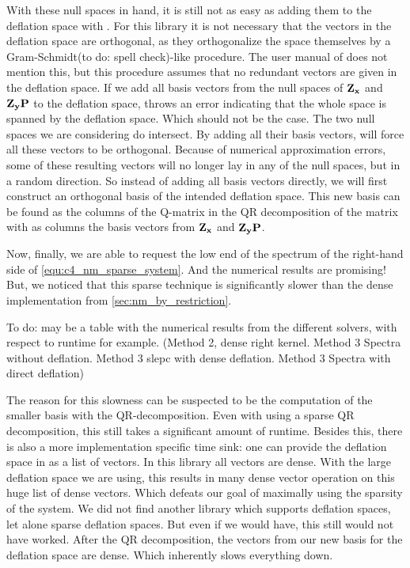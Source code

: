 With these null spaces in hand, it is still not as easy as adding them to the deflation space with \slepc. For this library it is not necessary that the vectors in the deflation space are orthogonal, as they orthogonalize the space themselves by a Gram-Schmidt({{\color{red}to do: spell check}})-like procedure. The user manual of \slepc does not mention this, but this procedure assumes that no redundant vectors are given in the deflation space. If we add all basis vectors from the null spaces of $\vb{Z_x}$ and $\vb{Z_y}\vb{P}$ to the deflation space, \slepc throws an error indicating that the whole space is spanned by the deflation space. Which should not be the case. The two null spaces we are considering do intersect. By adding all their basis vectors, \slepc will force all these vectors to be orthogonal. Because of numerical approximation errors, some of these resulting vectors will no longer lay in any of the null spaces, but in a random direction. So instead of adding all basis vectors directly, we will first construct an orthogonal basis of the intended deflation space. This new basis can be found as the columns of the Q-matrix in the QR decomposition of the matrix with as columns the basis vectors from $\vb{Z_x}$ and $\vb{Z_y} \vb{P}$.

Now, finally, we are able to request the low end of the spectrum of the right-hand side of \eqref{equ:c4_nm_sparse_system}. And the numerical results are promising! But, we noticed that this sparse technique is significantly slower than the dense implementation from \ref{sec:nm_by_restriction}.

{\color{red} To do: may be a table with the numerical results from the different solvers, with respect to runtime for example. (Method 2, dense right kernel. Method 3 Spectra without deflation. Method 3 slepc with dense deflation. Method 3 Spectra with direct deflation)}

The reason for this slowness can be suspected to be the computation of the smaller basis with the QR-decomposition. Even with using a sparse QR decomposition, this still takes a significant amount of runtime. Besides this, there is also a more implementation specific time sink: one can provide the deflation space in \slepc as a list of vectors. In this library all vectors are dense. With the large deflation space we are using, this results in many dense vector operation on this huge list of dense vectors. Which defeats our goal of maximally using the sparsity of the system. We did not find another library which supports deflation spaces, let alone sparse deflation spaces. But even if we would have, this still would not have worked. After the QR decomposition, the vectors from our new basis for the deflation space are dense. Which inherently slows everything down.

